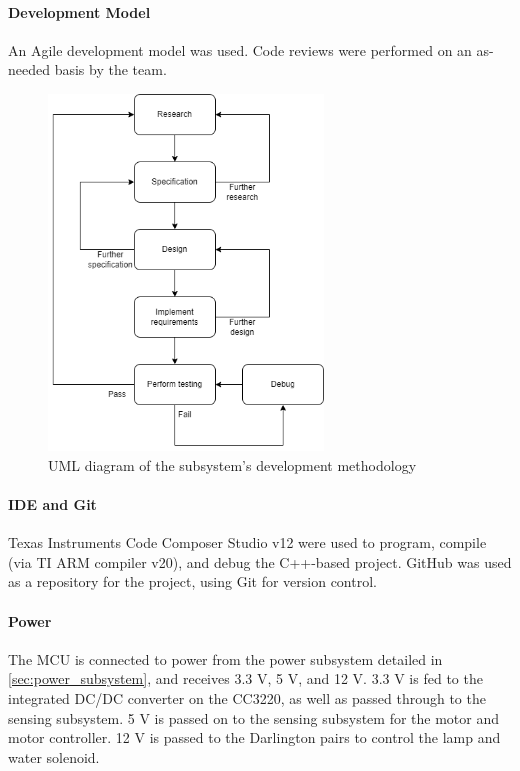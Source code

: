 \paragraph{Development Model}
An Agile development model was used. Code reviews were performed on
an as-needed basis by the team.
\begin{figure}[H]
    \caption{UML diagram of the subsystem's development methodology}
    \label{mcu_agile_uml}
    \centering
    \includegraphics[width=0.65\textwidth]{images/mcu_agile_uml.png}
\end{figure}

\paragraph{IDE and Git}
Texas Instruments Code Composer Studio v12 were used to program,
compile (via TI ARM compiler v20), and debug the C++-based project. GitHub
was used as a repository for the project, using Git for version
control.

\paragraph{Power}
The MCU is connected to power from the power subsystem detailed in \autoref{sec:power_subsystem}, and receives 3.3 V, 5 V, and 12 V. 3.3 V is fed to the integrated DC/DC converter on the CC3220, as well as passed through to the sensing subsystem. 5 V is passed on to the sensing subsystem for the motor and motor controller. 12 V is passed to the Darlington pairs to control the lamp and water solenoid.

